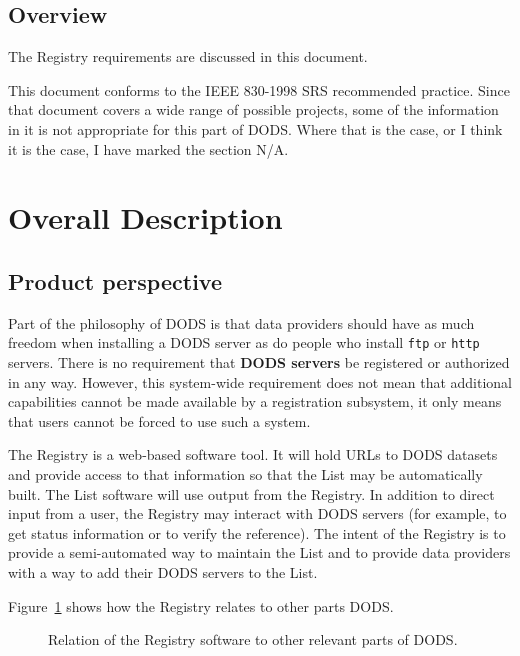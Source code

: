 \documentclass{article}
\begin{document}
\subsection{Overview}

The Registry requirements are discussed in this document.

This document conforms to the IEEE 830-1998 \ac{SRS} recommended practice.
Since that document covers a wide range of possible projects, some of the
information in it is not appropriate for this part of DODS. Where that is the
case, or I think it is the case, I have marked the section N/A.

\section{Overall Description}

\subsection{Product perspective}

Part of the philosophy of \acs{DODS} is that data providers should have as
much freedom when installing a \acs{DODS} server as do people who install
{\tt ftp} or {\tt http} servers.  There is no requirement that
\textbf{\acs{DODS} servers}  be registered or
authorized in any way.  However, this system-wide requirement does not mean
that additional capabilities cannot be made available by a registration
subsystem, it only means that users cannot be forced to use such a system.

The Registry is a web-based software tool. It will hold URLs to DODS datasets
and provide access to that information so that the List may be automatically
built. The List software will use output from the Registry. In addition to
direct input from a user, the Registry may interact with DODS servers (for
example, to get status information or to verify the reference).  The intent
of the Registry is to provide a semi-automated way to maintain the List and
to provide data providers with a way to add their DODS servers to the List.

Figure~\ref{fig:prod-perspective} shows how the Registry relates to other
parts \acs{DODS}.

\begin{figure}
\begin{center}
\end{center}
\caption{Relation of the Registry software to other relevant parts
  of DODS.}
\label{fig:prod-perspective}
\end{figure}
\end{document}
